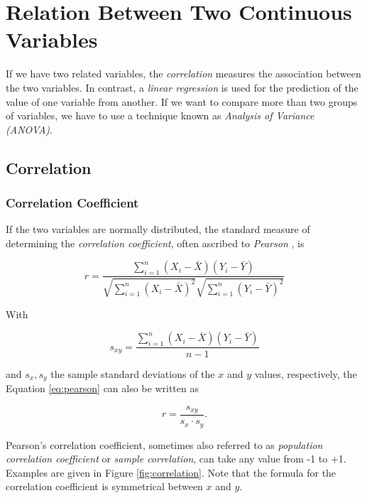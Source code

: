 \chapter{Relation Between Two Continuous Variables}

If we have two related variables, the \emph{correlation} measures the association between the two variables. In contrast, a \emph{linear regression} is used for the prediction of the value of one variable from another. If we want to compare more than two groups of variables, we have to use a technique known as \emph{Analysis of Variance (ANOVA)}.

\section{Correlation}

\subsection{Correlation Coefficient} 

If the two variables are normally distributed, the standard measure of determining the \emph{correlation coefficient}, often ascribed to \emph{Pearson} , is

\begin{equation}\label{eq:pearson}
  r = \frac{\sum\limits_{i=1}^n (X_i - \bar{X})(Y_i - \bar{Y})}{\sqrt{\sum\limits_{i=1}^n (X_i - \bar{X})^2} \sqrt{\sum\limits_{i=1}^n (Y_i - \bar{Y})^2}}
\end{equation}

With

\begin{equation}
  s_{xy} = \frac{\sum\limits_{i=1}^n (X_i - \bar{X})(Y_i - \bar{Y})}{n-1}
\end{equation}

and $s_x, s_y$ the sample standard deviations of the $x$ and $y$ values, respectively, the Equation \ref{eq:pearson} can also be written as

\begin{equation}
  r = \frac{s_{xy}}{s_x \cdot s_y}.
\end{equation}

Pearson's correlation coefficient, sometimes also referred to as \emph{population correlation coefficient} or \emph{sample correlation}, can take any value from -1 to +1. Examples are given in Figure \ref{fig:correlation}. Note that the formula for the correlation coefficient is symmetrical between $x$ and $y$.

